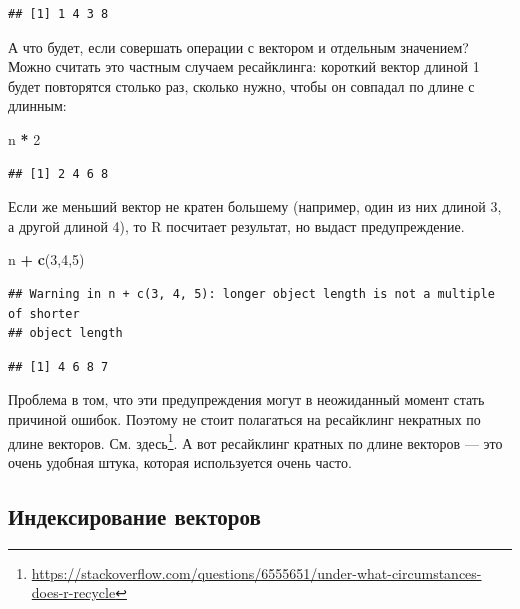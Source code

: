 \documentclass[
]{book}
\newenvironment{Shaded}{\begin{snugshade}}{\end{snugshade}}
\newcommand{\DecValTok}[1]{\textcolor[rgb]{0.00,0.00,0.81}{#1}}
\newcommand{\KeywordTok}[1]{\textcolor[rgb]{0.13,0.29,0.53}{\textbf{#1}}}
\newcommand{\NormalTok}[1]{#1}
\newcommand{\OperatorTok}[1]{\textcolor[rgb]{0.81,0.36,0.00}{\textbf{#1}}}
\newcommand{\StringTok}[1]{\textcolor[rgb]{0.31,0.60,0.02}{#1}}
\renewcommand{\href}[2]{#2\footnote{\url{#1}}}
\begin{document}
\begin{verbatim}
## [1] 1 4 3 8
\end{verbatim}

А что будет, если совершать операции с вектором и отдельным значением? Можно считать это частным случаем ресайклинга: короткий вектор длиной 1 будет повторятся столько раз, сколько нужно, чтобы он совпадал по длине с длинным:

\begin{Shaded}
\begin{Highlighting}[]
\NormalTok{n }\OperatorTok{*}\StringTok{ }\DecValTok{2}
\end{Highlighting}
\end{Shaded}

\begin{verbatim}
## [1] 2 4 6 8
\end{verbatim}

Если же меньший вектор не кратен большему (например, один из них длиной 3, а другой длиной 4), то R посчитает результат, но выдаст предупреждение.

\begin{Shaded}
\begin{Highlighting}[]
\NormalTok{n }\OperatorTok{+}\StringTok{ }\KeywordTok{c}\NormalTok{(}\DecValTok{3}\NormalTok{,}\DecValTok{4}\NormalTok{,}\DecValTok{5}\NormalTok{)}
\end{Highlighting}
\end{Shaded}

\begin{verbatim}
## Warning in n + c(3, 4, 5): longer object length is not a multiple of shorter
## object length
\end{verbatim}

\begin{verbatim}
## [1] 4 6 8 7
\end{verbatim}

Проблема в том, что эти предупреждения могут в неожиданный момент стать причиной ошибок. Поэтому не стоит полагаться на ресайклинг некратных по длине векторов. \href{https://stackoverflow.com/questions/6555651/under-what-circumstances-does-r-recycle}{См. здесь}. А вот ресайклинг кратных по длине векторов --- это очень удобная штука, которая используется очень часто.

\hypertarget{index_atomic}{%
\subsection{Индексирование векторов}\label{index_atomic}}
\end{document}
